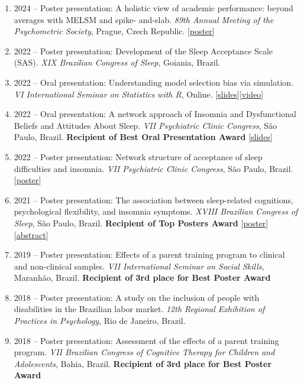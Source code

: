\documentclass[10pt,]{article}
\begin{document}
\begin{enumerate}
\def\labelenumi{\arabic{enumi}.}
\item
  2024 -- Poster presentation: A holistic view of academic performance:
  beyond averages with MELSM and spike- and-slab. \emph{89th Annual
  Meeting of the Psychometric Society}, Prague, Czech Republic.
  {[}\href{https://marwincarmo.github.io/posters/imps24}{poster}{]}
\item
  2022 -- Poster presentation: Development of the Sleep Acceptance Scale
  (SAS). \emph{XIX Brazilian Congress of Sleep}, Goiania, Brazil.
\item
  2022 -- Oral presentation: Understanding model selection bias via
  simulation. \emph{VI International Seminar on Statistics with R},
  Online.
  {[}\href{https://marwincarmo.github.io/slides/vi-ser/selection-bias}{slides}{]}{[}\href{https://www.youtube.com/watch?v=eyd1VCAX864&t=910s}{video}{]}
\item
  2022 -- Oral presentation: A network approach of Insomnia and
  Dysfunctional Beliefs and Attitudes About Sleep. \emph{VII Psychiatric
  Clinic Congress}, São Paulo, Brazil. \textbf{Recipient of Best Oral
  Presentation Award}
  {[}\href{https://marwincarmo.github.io/slides/viiccp/dbas-network_slides}{slides}{]}
\item
  2022 -- Poster presentation: Network structure of acceptance of sleep
  difficulties and insomnia. \emph{VII Psychiatric Clinic Congress}, São
  Paulo, Brazil.
  {[}\href{https://marwincarmo.github.io/posters/poster_viicp_spaq}{poster}{]}
\item
  2021 -- Poster presentation: The association between sleep-related
  cognitions, psychological flexibility, and insomnia symptoms.
  \emph{XVIII Brazilian Congress of Sleep}, São Paulo, Brazil.
  \textbf{Recipient of Top Posters Award}
  {[}\href{https://marwincarmo.github.io/posters/cb_sono_poster}{poster}{]}
  {[}\href{https://sono2021.com.br/evento/sono2021/trabalhosaprovados/naintegra/1047}{abstract}{]}
\item
  2019 -- Poster presentation: Effects of a parent training program to
  clinical and non-clinical samples. \emph{VII International Seminar on
  Social Skills}, Maranhão, Brazil. \textbf{Recipient of 3rd place for
  Best Poster Award}
\item
  2018 -- Poster presentation: A study on the inclusion of people with
  disabilities in the Brazilian labor market. \emph{12th Regional
  Exhibition of Practices in Psychology}, Rio de Janeiro, Brazil.
\item
  2018 -- Poster presentation: Assessment of the effects of a parent
  training program. \emph{VII Brazilian Congress of Cognitive Therapy
  for Children and Adolescents}, Bahia, Brazil. \textbf{Recipient of 3rd
  place for Best Poster Award}
\end{enumerate}
\end{document}
